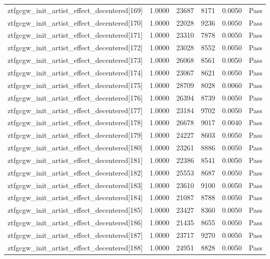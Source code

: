 \begin{table}[htbp]
\begin{tabular}{llrrll}
ztfgcgw\_init\_artist\_effect\_decentered[169] & 1.0000 & 23687 & 8171 & 0.0050 & Pass \\
ztfgcgw\_init\_artist\_effect\_decentered[170] & 1.0000 & 22028 & 9236 & 0.0050 & Pass \\
ztfgcgw\_init\_artist\_effect\_decentered[171] & 1.0000 & 23310 & 7878 & 0.0050 & Pass \\
ztfgcgw\_init\_artist\_effect\_decentered[172] & 1.0000 & 23028 & 8552 & 0.0050 & Pass \\
ztfgcgw\_init\_artist\_effect\_decentered[173] & 1.0000 & 26068 & 8561 & 0.0050 & Pass \\
ztfgcgw\_init\_artist\_effect\_decentered[174] & 1.0000 & 23067 & 8621 & 0.0050 & Pass \\
ztfgcgw\_init\_artist\_effect\_decentered[175] & 1.0000 & 28709 & 8028 & 0.0060 & Pass \\
ztfgcgw\_init\_artist\_effect\_decentered[176] & 1.0000 & 26394 & 8739 & 0.0050 & Pass \\
ztfgcgw\_init\_artist\_effect\_decentered[177] & 1.0000 & 23184 & 9702 & 0.0050 & Pass \\
ztfgcgw\_init\_artist\_effect\_decentered[178] & 1.0000 & 26678 & 9017 & 0.0040 & Pass \\
ztfgcgw\_init\_artist\_effect\_decentered[179] & 1.0000 & 24227 & 8603 & 0.0050 & Pass \\
ztfgcgw\_init\_artist\_effect\_decentered[180] & 1.0000 & 23261 & 8886 & 0.0050 & Pass \\
ztfgcgw\_init\_artist\_effect\_decentered[181] & 1.0000 & 22386 & 8541 & 0.0050 & Pass \\
ztfgcgw\_init\_artist\_effect\_decentered[182] & 1.0000 & 25553 & 8687 & 0.0050 & Pass \\
ztfgcgw\_init\_artist\_effect\_decentered[183] & 1.0000 & 23610 & 9100 & 0.0050 & Pass \\
ztfgcgw\_init\_artist\_effect\_decentered[184] & 1.0000 & 21087 & 8788 & 0.0050 & Pass \\
ztfgcgw\_init\_artist\_effect\_decentered[185] & 1.0000 & 23427 & 8360 & 0.0050 & Pass \\
ztfgcgw\_init\_artist\_effect\_decentered[186] & 1.0000 & 21435 & 8655 & 0.0050 & Pass \\
ztfgcgw\_init\_artist\_effect\_decentered[187] & 1.0000 & 23717 & 9270 & 0.0050 & Pass \\
ztfgcgw\_init\_artist\_effect\_decentered[188] & 1.0000 & 24951 & 8828 & 0.0050 & Pass \\

\end{tabular}
\end{table}
